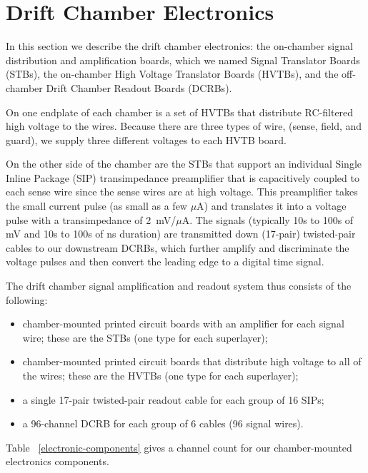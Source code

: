 \section{Drift Chamber Electronics}

In this section we describe the drift chamber electronics:
the on-chamber signal distribution and amplification boards, which
we named Signal Translator Boards (STBs), the on-chamber High Voltage Translator Boards (HVTBs), and the
off-chamber Drift Chamber Readout Boards (DCRBs).

On one endplate of each chamber is a set of HVTBs that distribute RC-filtered high voltage
to the wires.  Because there are three types of wire, (sense, field, and guard), we supply
three different voltages to each HVTB board.  

On the other side of the chamber are the STBs that support an individual Single Inline Package
(SIP) transimpedance preamplifier that is capacitively coupled to each sense wire since the
sense wires are at high voltage.  This preamplifier takes the
small current pulse (as small as a few $\mu$A) and translates it into a voltage 
pulse with a transimpedance of 2~mV/$\mu$A.  The signals (typically
10s to 100s of mV and 10s to 100s of ns duration) are
transmitted down (17-pair) twisted-pair cables to our downstream DCRBs, which further amplify and
discriminate the voltage pulses and then convert the leading edge
to a digital time signal.

The drift chamber signal amplification and readout system thus consists of the following:
\begin{itemize}
\item  chamber-mounted printed circuit boards with an amplifier for each signal wire; 
these are the STBs (one type for each superlayer);
\item  chamber-mounted printed circuit boards that distribute high voltage
to all of the wires; these are the HVTBs (one type for each superlayer);
\item a single 17-pair twisted-pair readout cable for each group of 16
SIPs;
\item a 96-channel DCRB for each group of 6 cables (96 signal wires).
\end{itemize}

Table ~\ref{electronic-components} gives a channel count for our chamber-mounted electronics components.

